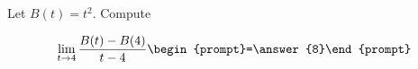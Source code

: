 \documentclass{ximera}
\author{Bart Snapp}
\begin{document}
\begin{exercise}
Let $B(t) = t^2$. Compute

\[
\lim_{ t\to 4 } 
\frac{B(t)-B(4)}{t-4} \begin{prompt}=\answer{8}\end{prompt}
\]
\end{exercise}
\end{document}
